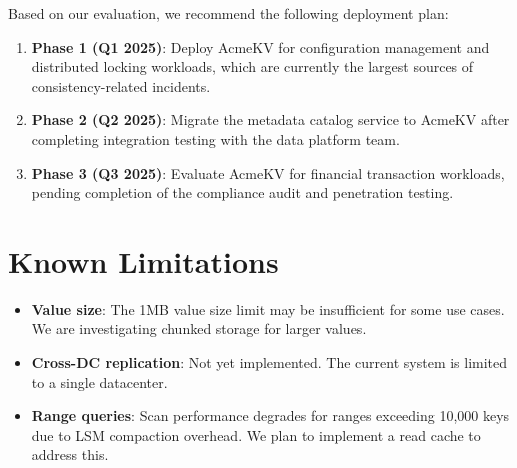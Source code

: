 \documentclass[12pt,a4paper]{report}
\begin{document}
Based on our evaluation, we recommend the following deployment plan:

\begin{enumerate}[itemsep=4pt]
  \item \textbf{Phase 1 (Q1 2025)}: Deploy AcmeKV for configuration management and distributed locking workloads, which are currently the largest sources of consistency-related incidents.
  \item \textbf{Phase 2 (Q2 2025)}: Migrate the metadata catalog service to AcmeKV after completing integration testing with the data platform team.
  \item \textbf{Phase 3 (Q3 2025)}: Evaluate AcmeKV for financial transaction workloads, pending completion of the compliance audit and penetration testing.
\end{enumerate}

\section{Known Limitations}

\begin{itemize}[itemsep=4pt]
  \item \textbf{Value size}: The 1MB value size limit may be insufficient for some use cases. We are investigating chunked storage for larger values.
  \item \textbf{Cross-DC replication}: Not yet implemented. The current system is limited to a single datacenter.
  \item \textbf{Range queries}: Scan performance degrades for ranges exceeding 10,000 keys due to LSM compaction overhead. We plan to implement a read cache to address this.
\end{itemize}
\end{document}
